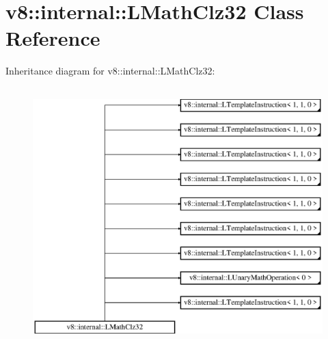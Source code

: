 \hypertarget{classv8_1_1internal_1_1_l_math_clz32}{}\section{v8\+:\+:internal\+:\+:L\+Math\+Clz32 Class Reference}
\label{classv8_1_1internal_1_1_l_math_clz32}
Inheritance diagram for v8\+:\+:internal\+:\+:L\+Math\+Clz32\+:\begin{figure}[H]
\begin{center}
\leavevmode
\includegraphics[height=10.000000cm]{classv8_1_1internal_1_1_l_math_clz32}
\end{center}
\end{figure}
